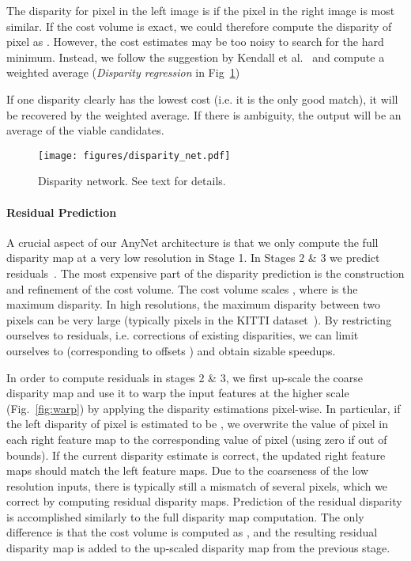 \documentclass[letterpaper, 10 pt, conference]{ieeeconf}
\newcommand{\nameshort}[1]{AnyNet}
\begin{document}
The disparity for pixel  in the left image is  if the pixel  in the right image is most similar. If the cost volume is exact, we could therefore compute the disparity of pixel  as .  However, the cost estimates may be too noisy to search for the hard minimum. Instead, we follow the suggestion by Kendall et al.~\cite{kendall2017end} and compute a weighted average  (\emph{Disparity regression} in Fig~\ref{fig:disp})

If one disparity  clearly has the lowest cost (i.e. it is the only good match), it will be recovered by the weighted average. If there is ambiguity, the output will be an average of the viable candidates. 






\begin{figure}[t]
  \centering
\texttt{[image: figures/disparity\_net.pdf]}
\caption{Disparity network. See text for details.}
  \label{fig:disp}
  \vspace{-0.5cm}
\end{figure}


\paragraph{Residual Prediction}
A crucial aspect of our \nameshort{} architecture is that we only compute the full disparity map at a very low resolution in Stage 1. In Stages 2 \& 3 we predict residuals~\cite{hui18liteflownet}. The most expensive part of the disparity prediction is the construction and refinement of the cost volume. 
The cost volume scales , where  is the maximum disparity. In high resolutions, the maximum disparity between two pixels can be very large (typically  pixels in the KITTI dataset~\cite{Geiger2012CVPR}). 
By restricting ourselves to residuals, i.e. corrections of existing disparities, we can limit ourselves to  (corresponding to offsets ) and obtain sizable speedups. 

In order to compute residuals in stages 2 \& 3, we first up-scale the coarse disparity map and use it to warp the input features at the higher scale (Fig.~\ref{fig:warp}) by applying the disparity estimations pixel-wise. In particular, if the left disparity of pixel  is estimated to be , we overwrite the value of pixel   in each right feature map to the corresponding value of pixel  (using zero if out of bounds). If the current disparity estimate is correct, the updated right feature maps should match the left feature maps. Due to the coarseness of the low resolution inputs, there is typically still a mismatch of several pixels, which we correct by computing residual disparity maps. 
Prediction of the residual disparity is accomplished similarly to the full disparity map computation. The only difference is that the cost volume is computed as , and the resulting residual disparity map is added to the up-scaled disparity map from the previous stage. 
\end{document}
